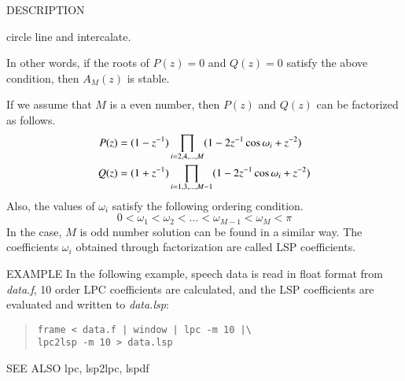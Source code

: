 \begin{qsection}{DESCRIPTION}
\begin{itemize}
      circle line and intercalate.
\end{itemize}
In other words, if  the roots of $P(z)=0$ and $Q(z)=0$ satisfy the
above condition, then $A_M(z)$ is stable.
\par
If we assume that $M$ is a even number, then
$P(z)$ and $Q(z)$ can be factorized as follows.
\begin{align}
  P(z) &= ( 1 - z^{-1} ) \prod_{i=2,4,\dots,M}
          ( 1 - 2 z^{-1} \cos \omega_i + z^{-2} ) \notag \\
  Q(z) &= ( 1 + z^{-1} ) \prod_{i=1,3,\dots,M-1}
          ( 1 - 2 z^{-1} \cos \omega_i + z^{-2} ) \notag
\end{align}
Also, the values of $\omega_i$ satisfy the following ordering condition.
\begin{displaymath}
  0 < \omega_1 < \omega_2 < \dots < \omega_{M-1} < \omega_M < \pi
\end{displaymath}
In the case, $M$ is odd number solution can be found in a similar way.
The coefficients $\omega_i$ obtained through factorization are called
LSP coefficients.
\end{qsection}

\begin{options}
\end{options}

\begin{qsection}{EXAMPLE}
In the following example, speech data is read in float format from
{\em data.f}, 10 order LPC coefficients are calculated,
and the LSP coefficients are evaluated and written to {\em data.lsp}:
\begin{quote}
\verb!frame < data.f | window | lpc -m 10 |\!\\
\verb!lpc2lsp -m 10 > data.lsp!
\end{quote}
\end{qsection}

\begin{qsection}{SEE ALSO}
lpc, lsp2lpc, lspdf
\end{qsection}
